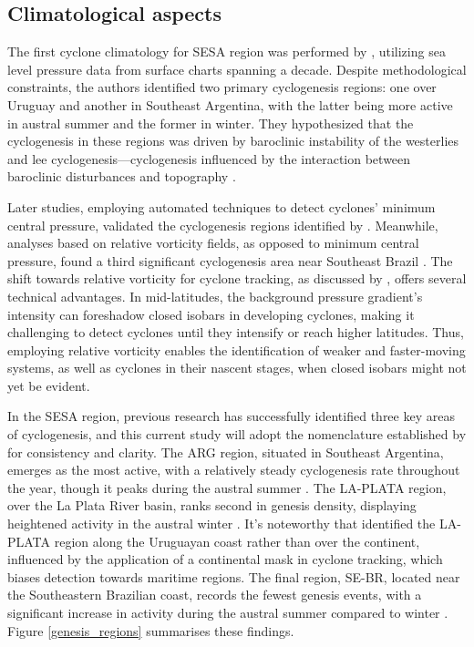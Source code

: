 \subsection{Climatological aspects}

The first cyclone climatology for SESA region was performed by \citet{gan1991surface}, utilizing sea level pressure data from surface charts spanning a decade. Despite methodological constraints, the authors identified two primary cyclogenesis regions: one over Uruguay and another in Southeast Argentina, with the latter being more active in austral summer and the former in winter. They hypothesized that the cyclogenesis in these regions was driven by baroclinic instability of the westerlies and lee cyclogenesis—cyclogenesis influenced by the interaction between baroclinic disturbances and topography \citep{gan1994influence,tibaldi1980orographically}.

Later studies, employing automated techniques to detect cyclones' minimum central pressure, validated the cyclogenesis regions identified by \citet{gan1991surface} \citep{simmonds1999southern,simmonds2000mean,mendes2010climatology}. Meanwhile, analyses based on relative vorticity fields, as opposed to minimum central pressure, found a third significant cyclogenesis area near Southeast Brazil \citep{hoskins2005new,sinclair1995climatology,reboita2010south,gramcianinov2019properties}. The shift towards relative vorticity for cyclone tracking, as discussed by \citet{hoskins2002new,sinclair1994objective}, offers several technical advantages. In mid-latitudes, the background pressure gradient's intensity can foreshadow closed isobars in developing cyclones, making it challenging to detect cyclones until they intensify or reach higher latitudes. Thus, employing relative vorticity enables the identification of weaker and faster-moving systems, as well as cyclones in their nascent stages, when closed isobars might not yet be evident.

In the SESA region, previous research has successfully identified three key areas of cyclogenesis, and this current study will adopt the nomenclature established by \citet{gramcianinov2019properties} for consistency and clarity. The ARG region, situated in Southeast Argentina, emerges as the most active, with a relatively steady cyclogenesis rate throughout the year, though it peaks during the austral summer \citep{crespo2021potential,gramcianinov2019properties,reboita2010south}. The LA-PLATA region, over the La Plata River basin, ranks second in genesis density, displaying heightened activity in the austral winter \citep{crespo2021potential,gramcianinov2019properties,reboita2010south}. It's noteworthy that \citet{reboita2010south} identified the LA-PLATA region along the Uruguayan coast rather than over the continent, influenced by the application of a continental mask in cyclone tracking, which biases detection towards maritime regions. The final region, SE-BR, located near the Southeastern Brazilian coast, records the fewest genesis events, with a significant increase in activity during the austral summer compared to winter \citep{reboita2010south,gramcianinov2019properties,crespo2021potential}. Figure \ref{genesis_regions} summarises these findings. 

